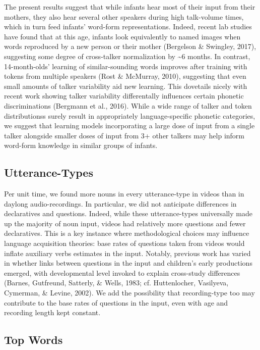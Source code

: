 \documentclass[man]{apa6}
\theoremstyle{definition}
\theoremstyle{definition}
\theoremstyle{definition}
\theoremstyle{remark}
\begin{document}
The present results suggest that while infants hear most of their input
from their mothers, they also hear several other speakers during high
talk-volume times, which in turn feed infants' word-form
representations. Indeed, recent lab studies have found that at this age,
infants look equivalently to named images when words reproduced by a new
person or their mother (Bergelson \& Swingley, 2017), suggesting some
degree of cross-talker normalization by \textasciitilde{}6 months. In
contrast, 14-month-olds' learning of similar-sounding words improves
after training with tokens from multiple speakers (Rost \& McMurray,
2010), suggesting that even small amounts of talker variability aid new
learning. This dovetails nicely with recent work showing talker
variability differentally influences certain phonetic discriminations
(Bergmann et al., 2016). While a wide range of talker and token
distributionss surely result in appropriately language-specific phonetic
categories, we suggest that learning models incorporating a large dose
of input from a single talker alongside smaller doses of input from 3+
other talkers may help inform word-form knowledge in similar groups of
infants.

\subsection{Utterance-Types}\label{utterance-types}

Per unit time, we found more nouns in every utterance-type in videos
than in daylong audio-recordings. In particular, we did not anticipate
differences in declaratives and questions. Indeed, while these
utterance-types universally made up the majority of noun input, videos
had relatively more questions and fewer declaratives. This is a key
instance where methodological choices may influence language acquisition
theories: base rates of questions taken from videos would inflate
auxiliary verbs estimates in the input. Notably, previous work has
varied in whether links between questions in the input and children's
early productions emerged, with developmental level invoked to explain
cross-study differences (Barnes, Gutfreund, Satterly, \& Wells, 1983;
cf. Huttenlocher, Vasilyeva, Cymerman, \& Levine, 2002). We add the
possibility that recording-type too may contribute to the base rates of
questions in the input, even with age and recording length kept
constant.

\subsection{Top Words}\label{top-words}
\end{document}
